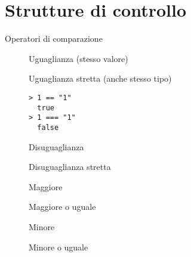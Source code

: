 \section{Strutture di controllo}
\begin{frame}[fragile]{Operatori di comparazione}\transfade\centering
  \begin{description}
    \item[\mintjs{==}] Uguaglianza (stesso valore)
    \item[\mintjs{===}] Uguaglianza stretta (anche stesso tipo)\smallskip
\begin{verbatim}
> 1 == "1"
  true
> 1 === "1"
  false
\end{verbatim}
    \pause\smallskip
    \item[\mintjs{!=}] Disuguaglianza
    \item[\mintjs{!==}] Disuguaglianza stretta
    \pause\smallskip
    \item[\mintjs{>}] Maggiore
    \item[\mintjs{>=}] Maggiore o uguale
    \item[\mintjs{<}] Minore
    \item[\mintjs{<=}] Minore o uguale
  \end{description}
\end{frame}

